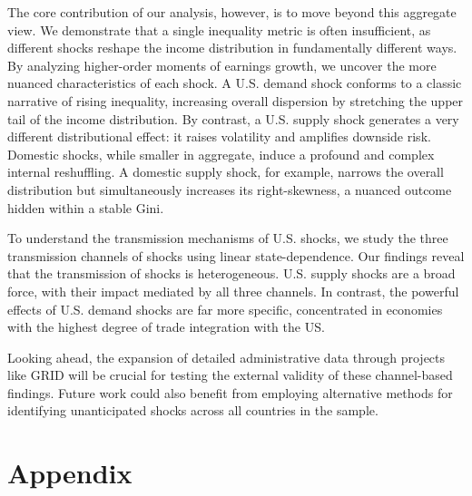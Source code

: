 \documentclass[12pt, a4paper]{article}
\begin{document}
The core contribution of our analysis, however, is to move beyond this aggregate view. We demonstrate that a single inequality metric is often insufficient, as different shocks reshape the income distribution in fundamentally different ways. By analyzing higher-order moments of earnings growth, we uncover the more nuanced characteristics of each shock. A U.S. demand shock conforms to a classic narrative of rising inequality, increasing overall dispersion by stretching the upper tail of the income distribution. By contrast, a U.S. supply shock generates a very different distributional effect: it raises volatility and amplifies downside risk. Domestic shocks, while smaller in aggregate, induce a profound and complex internal reshuffling. A domestic supply shock, for example, narrows the overall distribution but simultaneously increases its right-skewness, a nuanced outcome hidden within a stable Gini.

To understand the transmission mechanisms of U.S. shocks, we study the three transmission channels of shocks using linear state-dependence. Our findings reveal that the transmission of shocks is heterogeneous. U.S. supply shocks are a broad force, with their impact mediated by all three channels. In contrast, the powerful effects of U.S. demand shocks are far more specific, concentrated in economies with the highest degree of trade integration with the US.

Looking ahead, the expansion of detailed administrative data through projects like GRID will be crucial for testing the external validity of these channel-based findings. Future work could also benefit from employing alternative methods for identifying unanticipated shocks across all countries in the sample.

\newpage
\printbibliography
\pagebreak
\section*{Appendix}
\renewcommand{\thetable}{A\arabic{table}}
\renewcommand{\thefigure}{B\arabic{figure}}
\setcounter{figure}{0}
\setcounter{table}{0}
\end{document}
